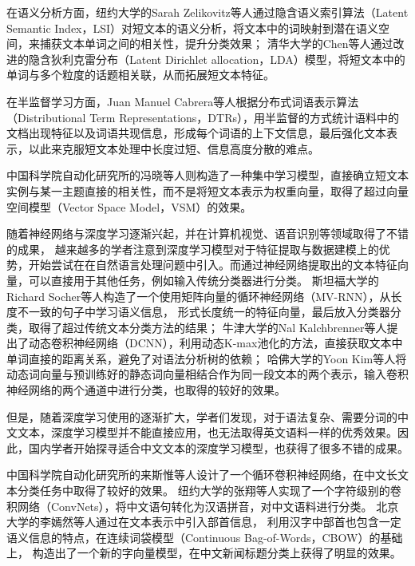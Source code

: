 在语义分析方面，纽约大学的Sarah Zelikovitz等人通过隐含语义索引算法（Latent Semantic Index，LSI）对短文本的语义分析，将文本中的词映射到潜在语义空间，来捕获文本单词之间的相关性，提升分类效果；
清华大学的Chen等人通过改进的隐含狄利克雷分布（Latent Dirichlet allocation，LDA）模型，将短文本中的单词与多个粒度的话题相关联，从而拓展短文本特征。

在半监督学习方面，Juan Manuel Cabrera等人根据分布式词语表示算法（Distributional Term Representations，DTRs），用半监督的方式统计语料中的文档出现特征以及词语共现信息，形成每个词语的上下文信息，最后强化文本表示，以此来克服短文本处理中长度过短、信息高度分散的难点。

中国科学院自动化研究所的冯晓等人则构造了一种集中学习模型，直接确立短文本实例与某一主题直接的相关性，而不是将短文本表示为权重向量，取得了超过向量空间模型（Vector Space Model，VSM）的效果。

随着神经网络与深度学习逐渐兴起，并在计算机视觉、语音识别等领域取得了不错的成果，
越来越多的学者注意到深度学习模型对于特征提取与数据建模上的优势，开始尝试在在自然语言处理问题中引入。而通过神经网络提取出的文本特征向量，可以直接用于其他任务，例如输入传统分类器进行分类。
斯坦福大学的Richard Socher等人构造了一个使用矩阵向量的循环神经网络（MV-RNN），从长度不一致的句子中学习语义信息，
形式长度统一的特征向量，最后放入分类器分类，取得了超过传统文本分类方法的结果；
牛津大学的Nal Kalchbrenner等人提出了动态卷积神经网络（DCNN），利用动态K-max池化的方法，直接获取文本中单词直接的距离关系，避免了对语法分析树的依赖；
哈佛大学的Yoon Kim等人将动态词向量与预训练好的静态词向量相结合作为同一段文本的两个表示，输入卷积神经网络的两个通道中进行分类，也取得的较好的效果。

但是，随着深度学习使用的逐渐扩大，学者们发现，对于语法复杂、需要分词的中文文本，深度学习模型并不能直接应用，也无法取得英文语料一样的优秀效果。因此，国内学者开始探寻适合中文文本的深度学习模型，也获得了很多不错的成果。

中国科学院自动化研究所的来斯惟等人设计了一个循环卷积神经网络，在中文长文本分类任务中取得了较好的效果。
纽约大学的张翔等人实现了一个字符级别的卷积网络（ConvNets），将中文语句转化为汉语拼音，对中文语料进行分类。
北京大学的李嫣然等人通过在文本表示中引入部首信息，
利用汉字中部首也包含一定语义信息的特点，在连续词袋模型（Continuous Bag-of-Words，CBOW）的基础上，
构造出了一个新的字向量模型，在中文新闻标题分类上获得了明显的效果。

